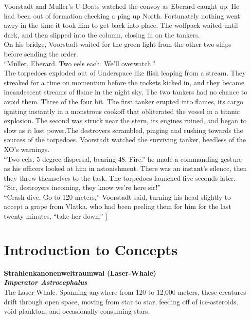 \documentclass[a4paper, twocolumn, openany]{book}
\begin{document}
{{{	Voorstadt and Muller’s U-Boats watched the convoy as Eberard caught up. He had been out of
	formation checking a ping up North. Fortunately nothing went awry in the time it took him to get
	back into place. The wolfpack waited until dark, and then slipped into the column, closing in on
	the tankers.\\

	On his bridge, Voorstadt waited for the green light from the other two ships before sending the
	order.\\

	“Muller, Eberard. Two eels each. We’ll overwatch.”\\

	The torpedoes exploded out of Underspace like flish leaping from a stream. They streaked for a
	time on momentum before the rockets kicked in, and they became incandescent streams of
	flame in the night sky. The two tankers had no chance to avoid them. Three of the four hit. The
	first tanker erupted into flames, its cargo igniting instantly in a monstrous cookoff that obliterated
	the vessel in a titanic explosion. The second was struck near the stern, its engines ruined, and
	began to slow as it lost power.The destroyers scrambled, pinging and rushing towards the
	sources of the torpedoes. Voorstadt watched the surviving tanker, heedless of the XO’s
	warnings.\\
	“Two eels, 5 degree dispersal, bearing 48. Fire.” he made a commanding gesture as his officers
	looked at him in astonishment. There was an instant’s silence, then they threw themselves to
	the task. The torpedoes launched five seconds later.\\
	“Sir, destroyers incoming, they know we’re here sir!”\\
	“Crash dive. Go to 120 meters,” Voorstadt said, turning his head slightly to accept a grape from
	Vlatka, who had been peeling them for him for the last twenty minutes, “take her down.”
	} %
}] %

\tableofcontents

\chapter{Introduction to Concepts}%
\pagestyle{myheadings}

	{\noindent\bfseries Strahlenkanonenweltraumwal (Laser-Whale)\\}
	{\bfseries\itshape Imperator Astrocephalus\\}
	The Laser-Whale. Spanning anywhere from 120 to 12,000 meters, these creatures drift through
	open space, moving from star to star, feeding off of ice-asteroids, void-plankton, and
	occasionally consuming stars.\\

}
\end{document}
